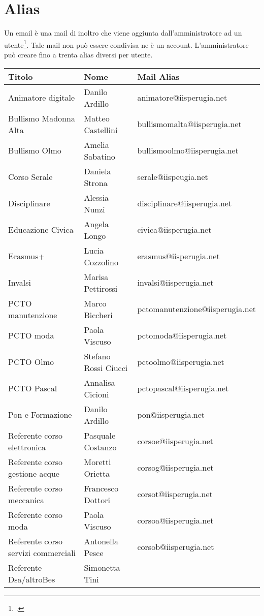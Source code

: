 \section{Alias}
Un email è una mail di inoltro che viene aggiunta dall'amministratore ad un utente\footcite{Google2023d}. Tale mail non può essere condivisa ne è un account.
L'amministratore può creare fino a trenta alias diversi per utente.
\begin{center}
	
\begin{tabular}{lll}
	\toprule 
	Titolo&Nome&Mail Alias\\
	\midrule
	Animatore digitale&
	Danilo Ardillo&
	animatore@iisperugia.net\\
	Bullismo Madonna Alta&
	Matteo Castellini&
	bullismomalta@iisperugia.net\\
	Bullismo Olmo&
	Amelia Sabatino&
	bullismoolmo@iisperugia.net\\
	Corso Serale&
	Daniela Strona&
	serale@iispeugia.net\\
	Disciplinare&
	Alessia Nunzi&
	disciplinare@iisperugia.net\\
	Educazione Civica&
	Angela Longo&
	civica@iisperugia.net\\
	Erasmus+&
	Lucia Cozzolino&
	erasmus@iisperugia.net\\
	Invalsi&
	Marisa Pettirossi&
	invalsi@iisperugia.net\\
	PCTO manutenzione&
	Marco Biccheri&
	pctomanutenzione@iisperugia.net\\
	PCTO moda&
	Paola Viscuso&
	pctomoda@iisperugia.net\\
	PCTO Olmo&
	Stefano Rossi Ciucci&
	pctoolmo@iisperugia.net\\
	PCTO Pascal&
	Annalisa Cicioni&
	pctopascal@iisperugia.net\\
	Pon e Formazione&
	Danilo Ardillo&
	pon@iisperugia.net\\
	Referente corso elettronica&
	Pasquale Costanzo&
	corsoe@iisperugia.net\\
	Referente corso gestione acque&
	Moretti Orietta&
	corsog@iisperugia.net\\
	Referente corso meccanica&
	Francesco Dottori&
	corsot@iisperugia.net\\
	Referente corso moda&
	Paola Viscuso&
	corsoa@iisperugia.net\\
	Referente corso servizi commerciali&
	Antonella Pesce&
	corsob@iisperugia.net\\
	Referente Dsa/altroBes&
	Simonetta Tini&

\end{tabular}
\end{center}
